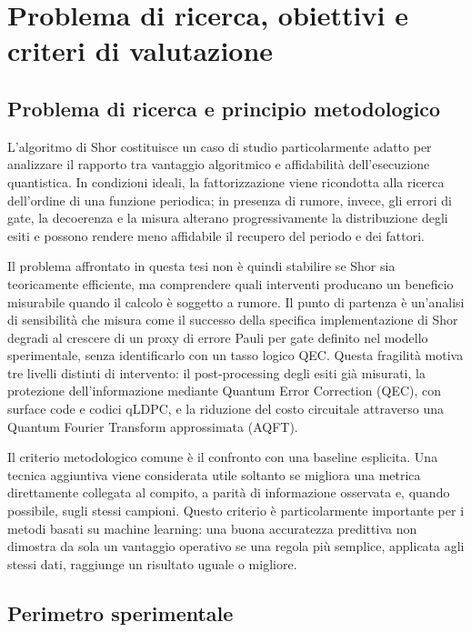 \chapter{Problema di ricerca, obiettivi e criteri di valutazione}
\label{chap:obiettivi}
\label{chap:specifiche}


\section{Problema di ricerca e principio metodologico}\label{sec:finale_2_1}

L'algoritmo di Shor costituisce un caso di studio particolarmente adatto per analizzare il rapporto tra vantaggio algoritmico e affidabilità dell'esecuzione quantistica. In condizioni ideali, la fattorizzazione viene ricondotta alla ricerca dell'ordine di una funzione periodica; in presenza di rumore, invece, gli errori di gate, la decoerenza e la misura alterano progressivamente la distribuzione degli esiti e possono rendere meno affidabile il recupero del periodo e dei fattori. \cite{shor1994,preskill2018,skosana2021,smolin2013}

Il problema affrontato in questa tesi non è quindi stabilire se Shor sia teoricamente efficiente, ma comprendere quali interventi producano un beneficio misurabile quando il calcolo è soggetto a rumore. Il punto di partenza è un'analisi di sensibilità che misura come il successo della specifica implementazione di Shor degradi al crescere di un proxy di errore Pauli per gate definito nel modello sperimentale, senza identificarlo con un tasso logico QEC. Questa fragilità motiva tre livelli distinti di intervento: il post-processing degli esiti già misurati, la protezione dell'informazione mediante Quantum Error Correction (QEC), con surface code e codici qLDPC, e la riduzione del costo circuitale attraverso una Quantum Fourier Transform approssimata (AQFT).

Il criterio metodologico comune è il confronto con una baseline esplicita. Una tecnica aggiuntiva viene considerata utile soltanto se migliora una metrica direttamente collegata al compito, a parità di informazione osservata e, quando possibile, sugli stessi campioni. Questo criterio è particolarmente importante per i metodi basati su machine learning: una buona accuratezza predittiva non dimostra da sola un vantaggio operativo se una regola più semplice, applicata agli stessi dati, raggiunge un risultato uguale o migliore.

\section{Perimetro sperimentale}\label{sec:finale_2_2}\label{sec:use_case}

